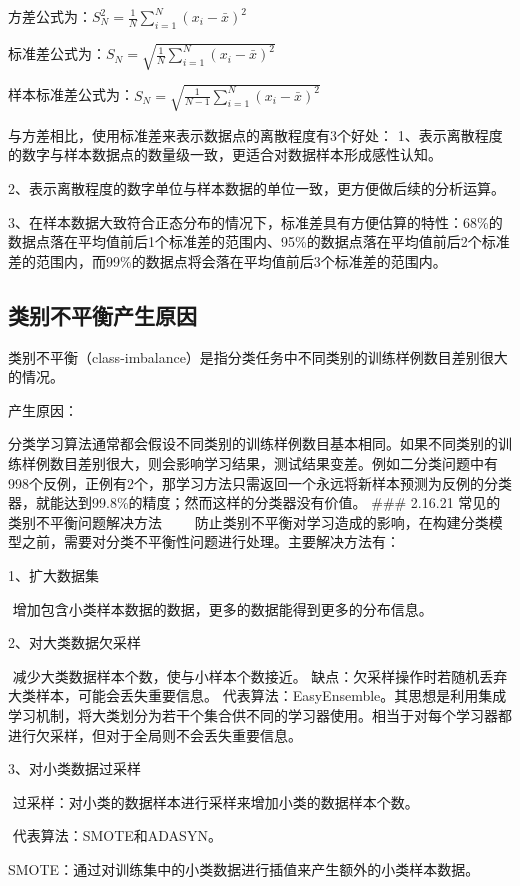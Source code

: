 方差公式为：$S^2_{N}=\frac{1}{N}\sum_{i=1}^{N}(x_{i}-\bar{x})^{2}​$

标准差公式为：$S_{N}=\sqrt{\frac{1}{N}\sum_{i=1}^{N}(x_{i}-\bar{x})^{2}}​$

样本标准差公式为：$S_{N}=\sqrt{\frac{1}{N-1}\sum_{i=1}^{N}(x_{i}-\bar{x})^{2}}​$

与方差相比，使用标准差来表示数据点的离散程度有3个好处：
1、表示离散程度的数字与样本数据点的数量级一致，更适合对数据样本形成感性认知。

2、表示离散程度的数字单位与样本数据的单位一致，更方便做后续的分析运算。

3、在样本数据大致符合正态分布的情况下，标准差具有方便估算的特性：68\%的数据点落在平均值前后1个标准差的范围内、95\%的数据点落在平均值前后2个标准差的范围内，而99\%的数据点将会落在平均值前后3个标准差的范围内。

\subsection{类别不平衡产生原因}\label{ux7c7bux522bux4e0dux5e73ux8861ux4ea7ux751fux539fux56e0}

​
类别不平衡（class-imbalance）是指分类任务中不同类别的训练样例数目差别很大的情况。

产生原因：

​
分类学习算法通常都会假设不同类别的训练样例数目基本相同。如果不同类别的训练样例数目差别很大，则会影响学习结果，测试结果变差。例如二分类问题中有998个反例，正例有2个，那学习方法只需返回一个永远将新样本预测为反例的分类器，就能达到99.8\%的精度；然而这样的分类器没有价值。
\#\#\# 2.16.21 常见的类别不平衡问题解决方法
  防止类别不平衡对学习造成的影响，在构建分类模型之前，需要对分类不平衡性问题进行处理。主要解决方法有：

1、扩大数据集

​ 增加包含小类样本数据的数据，更多的数据能得到更多的分布信息。

2、对大类数据欠采样

​ 减少大类数据样本个数，使与小样本个数接近。 ​
缺点：欠采样操作时若随机丢弃大类样本，可能会丢失重要信息。 ​
代表算法：EasyEnsemble。其思想是利用集成学习机制，将大类划分为若干个集合供不同的学习器使用。相当于对每个学习器都进行欠采样，但对于全局则不会丢失重要信息。

3、对小类数据过采样

​ 过采样：对小类的数据样本进行采样来增加小类的数据样本个数。

​ 代表算法：SMOTE和ADASYN。

​ SMOTE：通过对训练集中的小类数据进行插值来产生额外的小类样本数据。

